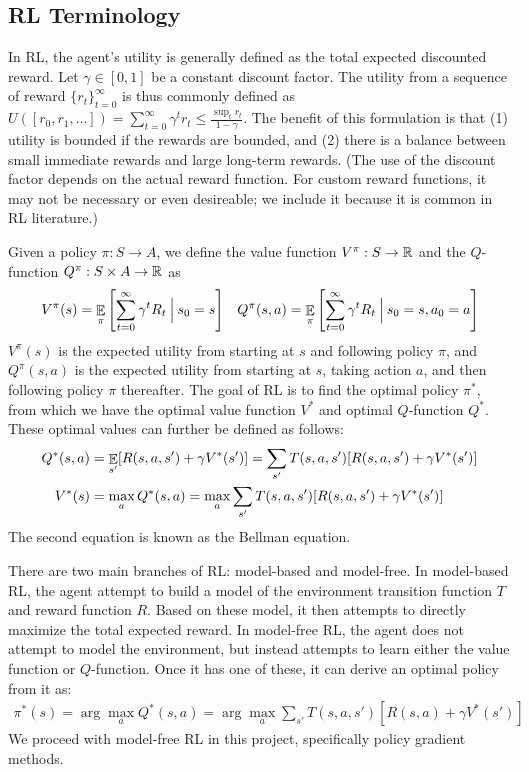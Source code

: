 \subsection{RL Terminology}

In RL, the agent's utility is generally defined as the total expected discounted reward.
Let $\gamma \in [0, 1]$ be a constant discount factor. The utility from a sequence of reward $\{r_t\}_{t=0}^\infty$ is
thus commonly defined as $U([r_0, r_1, \ldots]) = \sum_{t=0}^\infty \gamma^t r_t \leq \frac{\sup_t r_t}{1-\gamma}$.
The benefit of this formulation is that (1) utility is bounded if the rewards are bounded, and (2) there is a balance
between small immediate rewards and large long-term rewards. (The use of the discount factor depends on the actual reward function.
For custom reward functions, it may not be necessary or even desireable; we include it because it is common in RL literature.)

Given a policy $\pi: S \to A$, we define the value function $V^\pi: S \to \mathbb{R}$ and the $Q$-function $Q^\pi: S \times A \to \mathbb{R}$ as
\begin{align*}
  V^\pi(s) = \mathop{\mathbb{E}}_\pi\left[ \sum_{t=0}^\infty \gamma^t R_t \:\Big|\: s_0 = s  \right] &&
  Q^\pi(s, a) = \mathop{\mathbb{E}}_\pi\left[  \sum_{t=0}^\infty \gamma^t R_t \:\Big|\: s_0 = s, a_0 = a \right]
\end{align*}
$V^\pi(s)$ is the expected utility from starting at $s$ and following policy $\pi$, and $Q^\pi(s, a)$ is the expected utility
from starting at $s$, taking action $a$, and then following policy $\pi$ thereafter.
The goal of RL is to find the optimal policy $\pi^*$, from which we have the optimal value function $V^*$ and optimal $Q$-function $Q^*$.
These optimal values can further be defined as follows:
\begin{align*}
  Q^*(s, a) &= \mathop{\mathbb{E}}_{s'}[R(s, a, s') + \gamma V^*(s')] = \sum_{s'} T(s, a, s')[R(s, a, s') + \gamma V^*(s')] \\
  V^*(s) &= \max_a Q^*(s, a) = \max_a \sum_{s'} T(s, a, s')[R(s, a, s') + \gamma V^*(s')]
\end{align*}
The second equation is known as the Bellman equation.

There are two main branches of RL: model-based and model-free.
In model-based RL, the agent attempt to build a model of the environment transition function $T$ and reward function $R$.
Based on these model, it then attempts to directly maximize the total expected reward.
In model-free RL, the agent does not attempt to model the environment, but instead attempts to learn either the value function or $Q$-function.
Once it has one of these, it can derive an optimal policy from it as:
\begin{align*}
  \pi^*(s) = \arg\max_a Q^*(s, a) = \arg\max_a \sum_{s'} T(s, a, s')\left[ R(s, a) + \gamma V^*(s')\right]
\end{align*}
We proceed with model-free RL in this project, specifically policy gradient methods.

